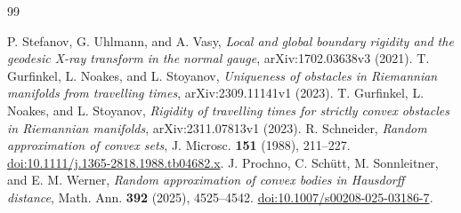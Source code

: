 \begin{thebibliography}{99}
\raggedright
{}
P. Stefanov, G. Uhlmann, and A. Vasy,
\emph{Local and global boundary rigidity and the geodesic X-ray transform
in the normal gauge}, arXiv:1702.03638v3 (2021).
T. Gurfinkel, L. Noakes, and L. Stoyanov,
\emph{Uniqueness of obstacles in Riemannian manifolds from travelling times},
arXiv:2309.11141v1 (2023).
T. Gurfinkel, L. Noakes, and L. Stoyanov,
\emph{Rigidity of travelling times for strictly convex obstacles in
Riemannian manifolds}, arXiv:2311.07813v1 (2023).
R. Schneider, \emph{Random approximation of convex sets},
J. Microsc. \textbf{151} (1988), 211--227.
\href{https://doi.org/10.1111/j.1365-2818.1988.tb04682.x}{doi:10.1111/j.1365-2818.1988.tb04682.x}.
J. Prochno, C. Sch\"utt, M. Sonnleitner, and E. M. Werner,
\emph{Random approximation of convex bodies in Hausdorff distance},
Math. Ann. \textbf{392} (2025), 4525--4542.
\href{https://doi.org/10.1007/s00208-025-03186-7}{doi:10.1007/s00208-025-03186-7}.
\end{thebibliography}
